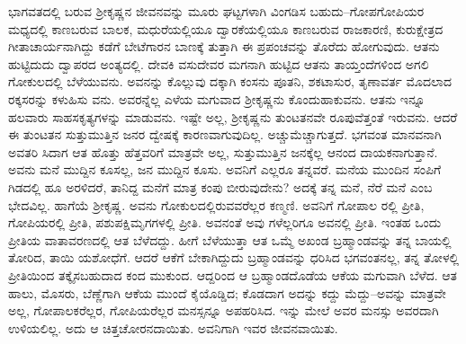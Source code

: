 ಭಾಗವತದಲ್ಲಿ ಬರುವ ಶ್ರೀಕೃಷ್ಣನ ಜೀವನವನ್ನು ಮೂರು ಘಟ್ಟಗಳಾಗಿ ವಿಂಗಡಿಸ ಬಹುದು–ಗೋಪಗೋಪಿಯರ ಮಧ್ಯದಲ್ಲಿ ಕಾಣಬರುವ ಬಾಲಕ, ಮಧುರೆಯಲ್ಲಿಯೂ ದ್ವಾರಕೆಯಲ್ಲಿಯೂ ಕಾಣಬರುವ ರಾಜಕಾರಣಿ, ಕುರುಕ್ಷೇತ್ರದ ಗೀತಾಚಾರ್ಯನಾಗಿದ್ದು ಕಡೆಗೆ ಬೇಟೆಗಾರನ ಬಾಣಕ್ಕೆ ತುತ್ತಾಗಿ ಈ ಪ್ರಪಂಚವನ್ನು ತೊರೆದು ಹೋಗುವುದು. ಆತನು ಹುಟ್ಟಿದುದು ದ್ವಾಪರದ ಅಂತ್ಯದಲ್ಲಿ. ದೇವಕಿ ವಸುದೇವರ ಮಗನಾಗಿ ಹುಟ್ಟಿದ ಆತನು ತಾಯ್ತಂದೆಗಳಿಂದ ಅಗಲಿ ಗೋಕುಲದಲ್ಲಿ ಬೆಳೆಯುವನು. ಅವನನ್ನು ಕೊಲ್ಲುವು ದಕ್ಕಾಗಿ ಕಂಸನು ಪೂತನಿ, ಶಕಟಾಸುರ, ತೃಣಾವರ್ತ ಮೊದಲಾದ ರಕ್ಕಸರನ್ನು ಕಳುಹಿಸು ವನು. ಅವರನ್ನೆಲ್ಲ ಎಳೆಯ ಮಗುವಾದ ಶ್ರೀಕೃಷ್ಣನು ಕೊಂದುಹಾಕುವನು. ಆತನು ಇನ್ನೂ ಹಲವಾರು ಸಾಹಸಕೃತ್ಯಗಳನ್ನು ಮಾಡುವನು. ಇಷ್ಟೇ ಅಲ್ಲ, ಶ್ರೀಕೃಷ್ಣನು ತುಂಟತನವೇ ರೂಪುವೆತ್ತಂತೆ ಇರುವನು. ಆದರೆ ಈ ತುಂಟತನ ಸುತ್ತುಮುತ್ತಿನ ಜನರ ದ್ವೇಷಕ್ಕೆ ಕಾರಣವಾಗುವುದಿಲ್ಲ. ಅಚ್ಚುಮೆಚ್ಚಾಗುತ್ತದೆ. ಭಗವಂತ ಮಾನವನಾಗಿ ಅವತರಿ ಸಿದಾಗ ಆತ ಹೊತ್ತು ಹೆತ್ತವರಿಗೆ ಮಾತ್ರವೇ ಅಲ್ಲ, ಸುತ್ತುಮುತ್ತಿನ ಜನಕ್ಕೆಲ್ಲ ಆನಂದ ದಾಯಕನಾಗುತ್ತಾನೆ. ಅವನು ಮನೆ ಮುದ್ದಿನ ಕೂಸಲ್ಲ, ಜನ ಮುದ್ದಿನ ಕೂಸು. ಅವನಿಗೆ ಎಲ್ಲರೂ ತನ್ನವರೆ. ಮನೆಯ ಮುಂದಿನ ಸಂಪಿಗೆ ಗಿಡದಲ್ಲಿ ಹೂ ಅರಳಿದರೆ, ತಾನಿದ್ದ ಮನೆಗೆ ಮಾತ್ರ ಕಂಪು ಬೀರುವುದೇನು? ಅದಕ್ಕೆ ತನ್ನ ಮನೆ, ನೆರೆ ಮನೆ ಎಂಬ ಭೇದವಿಲ್ಲ. ಹಾಗೆಯೆ ಶ್ರೀಕೃಷ್ಣ. ಅವನು ಗೋಕುಲದಲ್ಲಿರುವವರೆಲ್ಲರ ಕಣ್ಮಣಿ. ಅವನಿಗೆ ಗೋಪಾಲ ರಲ್ಲಿ ಪ್ರೀತಿ, ಗೋಪಿಯರಲ್ಲಿ ಪ್ರೀತಿ, ಪಶುಪಕ್ಷಿಮೃಗಗಳಲ್ಲಿ ಪ್ರೀತಿ. ಅವನಂತೆ ಅವು ಗಳೆಲ್ಲರಿಗೂ ಅವನಲ್ಲಿ ಪ್ರೀತಿ. ಇಂತಹ ಒಂದು ಪ್ರೀತಿಯ ವಾತಾವರಣದಲ್ಲಿ ಆತ ಬೆಳೆದದ್ದು. ಹೀಗೆ ಬೆಳೆಯುತ್ತಾ ಆತ ಒಮ್ಮೆ ಅಖಂಡ ಬ್ರಹ್ಮಾಂಡವನ್ನು ತನ್ನ ಬಾಯಲ್ಲಿ ತೋರಿದ, ತಾಯಿ ಯಶೋಧೆಗೆ. ಆದರೆ ಆಕೆಗೆ ಬೇಕಾಗಿದ್ದುದು ಬ್ರಹ್ಮಾಂಡವನ್ನು ಧರಿಸಿದ ಭಗವಂತನಲ್ಲ, ತನ್ನ ತೋಳಲ್ಲಿ ಪ್ರೀತಿಯಿಂದ ತಕ್ಕೈಸಬಹುದಾದ ಕಂದ ಮುಕುಂದ. ಆದ್ದರಿಂದ ಆ ಬ್ರಹ್ಮಾಂಡದೊಡೆಯ ಆಕೆಯ ಮಗುವಾಗಿ ಬೆಳೆದ. ಆತ ಹಾಲು, ಮೊಸರು, ಬೆಣ್ಣೆಗಾಗಿ ಆಕೆಯ ಮುಂದೆ ಕೈಯೊಡ್ಡಿದ; ಕೊಡದಾಗ ಅದನ್ನು ಕದ್ದು ಮೆದ್ದು–ಅವನ್ನು ಮಾತ್ರವೇ ಅಲ್ಲ, ಗೋಪಾಲಕರೆಲ್ಲರ, ಗೋಪಿಯರೆಲ್ಲರ ಮನಸ್ಸನ್ನೂ ಅಪಹರಿಸಿದ. ಇನ್ನು ಮೇಲೆ ಅವರ ಮನಸ್ಸು ಅವರದಾಗಿ ಉಳಿಯಲಿಲ್ಲ. ಅದು ಆ ಚಿತ್ತಚೋರನದಾಯಿತು. ಅವನಿಗಾಗಿ ಇವರ ಜೀವನವಾಯಿತು.

